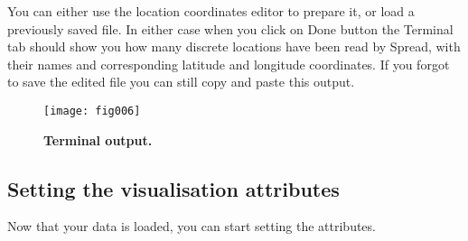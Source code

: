 You can either use the location coordinates editor to prepare it,
or load a previously saved file. In either case when you click on
Done button the Terminal tab should show you how many discrete locations
have been read by Spread, with their names and corresponding latitude
and longitude coordinates. If you forgot to save the edited file you
can still copy and paste this output.

\begin{figure}[h!]
\begin{centering}
\texttt{[image: fig006]}
\caption{
{ \footnotesize 
{\bf Terminal output.}
} %
}
\label{fig:006}
\par\end{centering}
\end{figure}

\subsection{Setting the visualisation attributes}

Now that your data is loaded, you can start setting the attributes.

